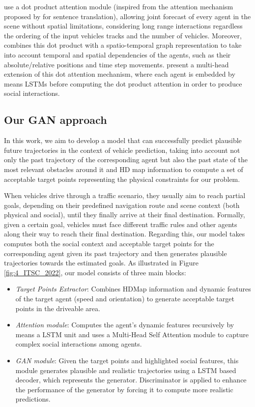 \cite{vemula2018social} use a dot product attention module (inspired from the attention mechanism proposed by \cite{vaswani2017attention} for sentence translation), allowing joint forecast of every agent in the scene without spatial limitations, considering long range interactions regardless the ordering of the input vehicles tracks and the number of vehicles. Moreover, \cite{vemula2018social} combines this dot product with a spatio-temporal graph representation to take into account temporal and spatial dependencies of the agents, such as their absolute/relative positions and time step movements. \cite{mercat2020multi} present a multi-head extension of this dot attention mechanism, where each agent is embedded by means LSTMs before computing the dot product attention in order to produce social interactions. 

\subsection{Our GAN approach}
\label{subsec:4_gan_lstm_ours}

In this work, we aim to develop a model \cite{gomez2022exploring} that can successfully predict plausible future trajectories in the context of vehicle prediction, taking into account not only the past trajectory of the corresponding agent but also the past state of the most relevant obstacles around it and HD map information to compute a set of acceptable target points representing the physical constraints for our problem.

When vehicles drive through a traffic scenario, they usually aim to reach partial goals, depending on their predefined navigation route and scene context (both physical and social), until they finally arrive at their final destination. Formally, given a certain goal, vehicles must face different traffic rules and other agents along their way to reach their final destination. Regarding this, our model takes computes both the social context and acceptable target points for the corresponding agent given its past trajectory and then generates plausible trajectories towards the estimated goals. As illustrated in Figure \ref{fig:4_ITSC_2022}, our model consists of three main blocks:

\begin{itemize}
	\item \textit{Target Points Extractor}: Combines HDMap information and dynamic features of the target agent (speed and orientation) to generate acceptable target points in the driveable area.
	\item \textit{Attention module}: Computes the agent's dynamic features recursively by means a LSTM unit and uses a Multi-Head Self Attention module to capture complex social interactions among agents.
	\item \textit{GAN module}: Given the target points and highlighted social features, this module generates plausible and realistic trajectories using a LSTM based decoder, which represents the generator. Discriminator is applied to enhance the performance of the generator by forcing it to compute more realistic predictions.
\end{itemize} 

